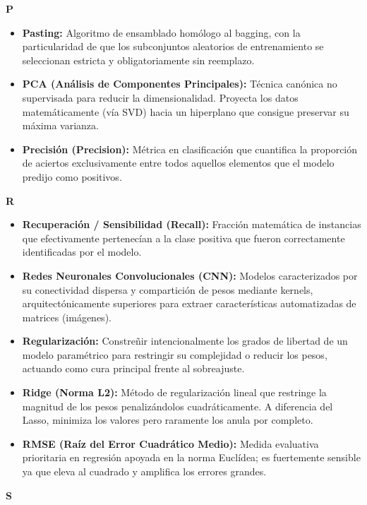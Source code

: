 \documentclass[12pt]{book} %
\providecommand{\tightlist}{%
  \setlength{\itemsep}{0pt}\setlength{\parskip}{0pt}}
\begin{document}
\textbf{P}

\begin{itemize}
\tightlist
\item
  \textbf{Pasting:} Algoritmo de ensamblado homólogo al bagging, con la
  particularidad de que los subconjuntos aleatorios de entrenamiento se
  seleccionan estricta y obligatoriamente sin reemplazo.
\item
  \textbf{PCA (Análisis de Componentes Principales):} Técnica canónica
  no supervisada para reducir la dimensionalidad. Proyecta los datos
  matemáticamente (vía SVD) hacia un hiperplano que consigue preservar
  su máxima varianza.
\item
  \textbf{Precisión (Precision):} Métrica en clasificación que
  cuantifica la proporción de aciertos exclusivamente entre todos
  aquellos elementos que el modelo predijo como positivos.
\end{itemize}

\textbf{R}

\begin{itemize}
\tightlist
\item
  \textbf{Recuperación / Sensibilidad (Recall):} Fracción matemática de
  instancias que efectivamente pertenecían a la clase positiva que
  fueron correctamente identificadas por el modelo.
\item
  \textbf{Redes Neuronales Convolucionales (CNN):} Modelos
  caracterizados por su conectividad dispersa y compartición de pesos
  mediante kernels, arquitectónicamente superiores para extraer
  características automatizadas de matrices (imágenes).
\item
  \textbf{Regularización:} Constreñir intencionalmente los grados de
  libertad de un modelo paramétrico para restringir su complejidad o
  reducir los pesos, actuando como cura principal frente al sobreajuste.
\item
  \textbf{Ridge (Norma L2):} Método de regularización lineal que
  restringe la magnitud de los pesos penalizándolos cuadráticamente. A
  diferencia del Lasso, minimiza los valores pero raramente los anula
  por completo.
\item
  \textbf{RMSE (Raíz del Error Cuadrático Medio):} Medida evaluativa
  prioritaria en regresión apoyada en la norma Euclídea; es fuertemente
  sensible ya que eleva al cuadrado y amplifica los errores grandes.
\end{itemize}

\textbf{S}
\end{document}
